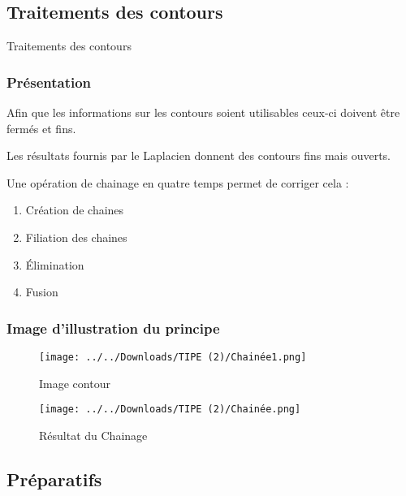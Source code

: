 \documentclass{beamer}
\begin{document}
\begin{frame}
\section{Traitements des contours}

\begin{block}
{ } \center Traitements des contours
\end{block}
\end{frame}


\begin{frame}
\frametitle{Présentation}
Afin que les informations sur les contours soient utilisables ceux-ci doivent être fermés et fins.

Les résultats fournis par le Laplacien donnent des contours fins mais ouverts.

Une opération de chainage en quatre temps permet de corriger cela :

\begin{enumerate}
\item Création de chaines
\item Filiation des chaines
\item Élimination
\item  Fusion
\end{enumerate}
\end{frame}

\begin{frame}
\frametitle {Image d'illustration du principe}
\begin{figure}[h]
    \begin{minipage}[c]{.46\linewidth}
        \centering
        \texttt{[image: ../../Downloads/TIPE (2)/Chainée1.png]}
        \caption{Image contour}
    \end{minipage}
    \hfill%
    \begin{minipage}[c]{.46\linewidth}
        \centering
        \texttt{[image: ../../Downloads/TIPE (2)/Chainée.png]}
        \caption{Résultat du Chainage}
    \end{minipage}
\end{figure}
\end{frame}

\subsection{Préparatifs}
\end{document}
